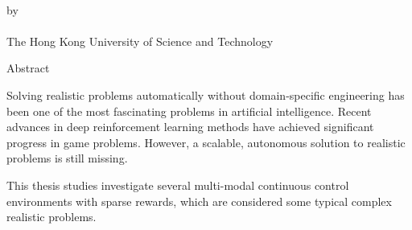 \begin{center}
{\Large \thesistitle}\\
\vspace{20mm}
by \thesisauthor\\
\vspace{15mm}
\departmentname\\
\vspace{10mm}
The Hong Kong University of Science and Technology
\end{center}
\vspace{8mm}
\begin{center}
Abstract

Solving realistic problems automatically without domain-specific engineering has been one of the most fascinating problems in artificial intelligence. Recent advances in deep reinforcement learning methods have achieved significant progress in game problems. However, a scalable, autonomous solution to realistic problems is still missing.

This thesis studies investigate several multi-modal continuous control environments with sparse rewards, which are considered some typical complex realistic problems. 
\end{center}
\par
\noindent


